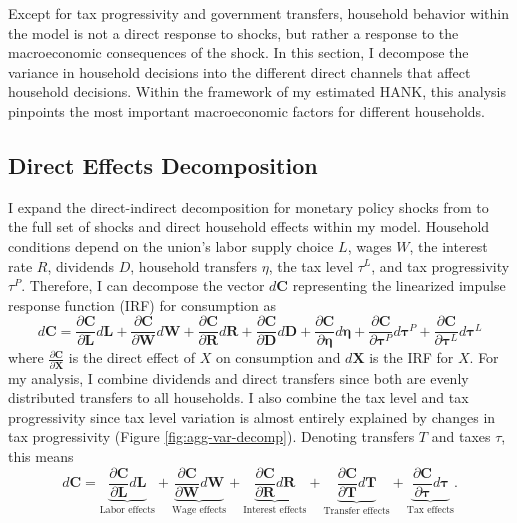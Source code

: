 Except for tax progressivity and government transfers, household behavior within the model is not a direct response to shocks, but rather a response to the macroeconomic consequences of the shock. In this section, I decompose the variance in household decisions into the different direct channels that affect household decisions. Within the framework of my estimated HANK, this analysis pinpoints the most important macroeconomic factors for different households.

\subsection{Direct Effects Decomposition}
I expand the direct-indirect decomposition for monetary policy shocks from \textcite{kaplan2018monetary} to the full set of shocks and direct household effects within my model. Household conditions depend on the union's labor supply choice $L$, wages $W$, the interest rate $R$, dividends $D$, household transfers $\eta$, the tax level $\tau^L$, and tax progressivity $\tau^P$. Therefore, I can decompose the vector $d \mathbf{C}$ representing the linearized impulse response function (IRF) for consumption as 
\[
    d \mathbf{C} = \frac{\partial \mathbf{C}}{\partial \mathbf{L}} d \mathbf{L} + \frac{\partial \mathbf{C}}{\partial \mathbf{W}} d \mathbf{W} + \frac{\partial \mathbf{C}}{\partial \mathbf{R}} d \mathbf{R} + \frac{\partial \mathbf{C}}{\partial \mathbf{D}} d \mathbf{D} + \frac{\partial \mathbf{C}}{\partial \boldsymbol{\eta}} d \boldsymbol{\eta} + \frac{\partial \mathbf{C}}{\partial \boldsymbol{\tau}^P} d \boldsymbol{\tau}^P + \frac{\partial \mathbf{C}}{\partial \boldsymbol{\tau}^L} d \boldsymbol{\tau}^L
\]
where $\frac{\partial \mathbf{C}}{\partial \mathbf{X}}$ is the direct effect of $X$ on consumption and $d \mathbf{X}$ is the IRF for $X$. For my analysis, I combine dividends and direct transfers since both are evenly distributed transfers to all households. I also combine the tax level and tax progressivity since tax level variation is almost entirely explained by changes in tax progressivity (Figure \ref{fig:agg-var-decomp}). Denoting transfers $T$ and taxes $\tau$, this means
\[
    d \mathbf{C} = \underbrace{\frac{\partial \mathbf{C}}{\partial \mathbf{L}} d \mathbf{L}}_{\text{Labor effects}} + \underbrace{\frac{\partial \mathbf{C}}{\partial \mathbf{W}} d \mathbf{W}}_{\text{Wage effects}} + \underbrace{\frac{\partial \mathbf{C}}{\partial \mathbf{R}} d \mathbf{R}}_{\text{Interest effects}} + \underbrace{\frac{\partial \mathbf{C}}{\partial \mathbf{T}} d \mathbf{T}}_{\text{Transfer effects}} + \underbrace{\frac{\partial \mathbf{C}}{\partial \boldsymbol{\tau}} d \boldsymbol{\tau}}_{\text{Tax effects}}.
\]

